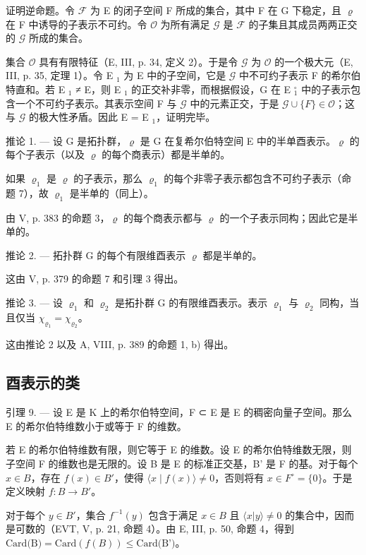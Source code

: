 证明逆命题。令 \(\mathcal{F}\) 为 E 的闭子空间 F 所成的集合，其中 F 在 G 下稳定，且 \(\varrho\) 在 F 中诱导的子表示不可约。令 \(\mathcal{O}\) 为所有满足 \(\mathcal{G}\) 是 \(\mathcal{F}\) 的子集且其成员两两正交的 \(\mathcal{G}\) 所成的集合。

集合 \(\mathcal{O}\) 具有有限特征（E, III, p. 34, 定义 2）。于是令 \(\mathcal{G}\) 为 \(\mathcal{O}\) 的一个极大元（E, III, p. 35, 定理 1）。令 E \(_1\) 为 E 中的子空间，它是 \(\mathcal{G}\) 中不可约子表示 F 的希尔伯特直和。若 E \(_1\) ≠ E，则 E \(_1\) 的正交补非零，而根据假设，G 在 E \(_1^{\circ}\) 中的子表示包含一个不可约子表示。其表示空间 F 与 \(\mathcal{G}\) 中的元素正交，于是 \(\mathcal{G} \cup \{F\} \in \mathcal{O}\)；这与 \(\mathcal{G}\) 的极大性矛盾。因此 E = E \(_1\)，证明完毕。

推论 1. --- 设 G 是拓扑群，\(\varrho\) 是 G 在复希尔伯特空间 E 中的半单酉表示。\(\varrho\) 的每个子表示（以及 \(\varrho\) 的每个商表示）都是半单的。

如果 \(\varrho_{1}\) 是 \(\varrho\) 的子表示，那么 \(\varrho_{1}\) 的每个非零子表示都包含不可约子表示（命题 7），故 \(\varrho_{1}\) 是半单的（同上）。

由 V, p. 383 的命题 3，\(\varrho\) 的每个商表示都与 \(\varrho\) 的一个子表示同构；因此它是半单的。

推论 2. --- 拓扑群 G 的每个有限维酉表示 \(\varrho\) 都是半单的。

这由 V, p. 379 的命题 7 和引理 3 得出。

推论 3. --- 设 \(\varrho_{1}\) 和 \(\varrho_{2}\) 是拓扑群 G 的有限维酉表示。表示 \(\varrho_{1}\) 与 \(\varrho_{2}\) 同构，当且仅当 \(\chi_{\varrho_{1}} = \chi_{\varrho_{2}}\)。

这由推论 2 以及 A, VIII, p. 389 的命题 1, b) 得出。

\subsection{酉表示的类}

引理 9. --- 设 E 是 K 上的希尔伯特空间，F ⊂ E 是 E 的稠密向量子空间。那么 E 的希尔伯特维数小于或等于 F 的维数。

若 E 的希尔伯特维数有限，则它等于 E 的维数。设 E 的希尔伯特维数无限，则子空间 F 的维数也是无限的。设 B 是 E 的标准正交基，B' 是 F 的基。对于每个 \(x \in B\)，存在 \(f(x) \in B'\)，使得 \(\langle x \mid f(x) \rangle \neq 0\)，否则将有 \(x \in F^{\circ} = \{0\}\)。于是定义映射 \(f: B \to B'\)。

对于每个 \(y \in B'\)，集合 \(f^{-1}(y)\) 包含于满足 \(x \in B\) 且 \(\langle x | y \rangle \neq 0\) 的集合中，因而是可数的（EVT, V, p. 21, 命题 4）。由 E, III, p. 50, 命题 4，得到 \(\text{Card(B)} = \text{Card}(f(B)) \leqslant \text{Card(B')}\)。

